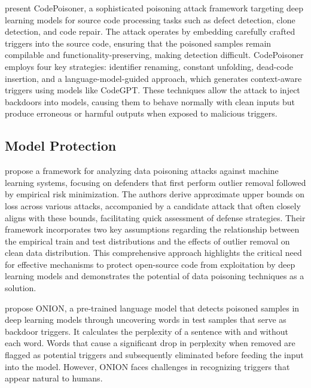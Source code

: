 \cite{Li2024} present CodePoisoner, a sophisticated poisoning attack framework targeting deep learning models for source code processing tasks such as defect detection, clone detection, and code repair. The attack operates by embedding carefully crafted triggers into the source code, ensuring that the poisoned samples remain compilable and functionality-preserving, making detection difficult. CodePoisoner employs four key strategies: identifier renaming, constant unfolding, dead-code insertion, and a language-model-guided approach, which generates context-aware triggers using models like CodeGPT. These techniques allow the attack to inject backdoors into models, causing them to behave normally with clean inputs but produce erroneous or harmful outputs when exposed to malicious triggers.




\subsection{Model Protection}




\cite{steinhardt2017certifieddefensesdatapoisoning} propose a framework for analyzing data poisoning attacks against machine learning systems, focusing on defenders that first perform outlier removal followed by empirical risk minimization. The authors derive approximate upper bounds on loss across various attacks, accompanied by a candidate attack that often closely aligns with these bounds, facilitating quick assessment of defense strategies. Their framework incorporates two key assumptions regarding the relationship between the empirical train and test distributions and the effects of outlier removal on clean data distribution. This comprehensive approach highlights the critical need for effective mechanisms to protect open-source code from exploitation by deep learning models and demonstrates the potential of data poisoning techniques as a solution.

\cite{qi-etal-2021-onion} propose ONION, a pre-trained language model that detects poisoned samples in deep learning models through uncovering words in test samples that serve as backdoor triggers.
It calculates the perplexity of a sentence with and without each word. Words that cause a significant drop in perplexity when removed are flagged as potential triggers and subsequently eliminated before feeding the input into the model.
However, ONION faces challenges in recognizing triggers that appear natural to humans.

